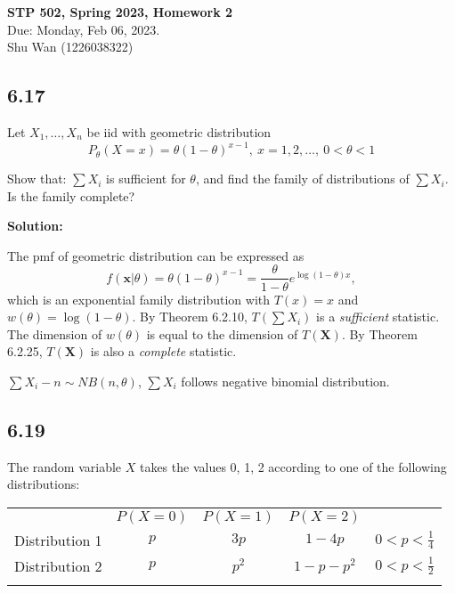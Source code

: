 \documentclass[11pt]{article}
\newcommand{\X}{\mathbf{X}}
\newcommand{\x}{\mathbf{x}}
\newcommand{\Sol}{\par {\bf Solution:}}
\newcommand{\sample}[1]{#1_1 , \dots , #1_n}
\begin{document}
\begin{center}
\Large{
\textbf{STP 502, Spring 2023, Homework 2} \\
Due: Monday, Feb 06, 2023. \\
Shu Wan (1226038322)
}
\end{center}

\subsection*{6.17}
Let $\sample{X}$ be iid with geometric distribution
$$P_\theta(X = x) = \theta(1-\theta)^{x-1}, ~ x = 1, 2, \dots, ~ 0 < \theta < 1$$

Show that: $\sum X_i$ is sufficient for $\theta$, and find the family of distributions of $\sum X_i$. Is the family complete?

\Sol

The pmf of geometric distribution can be expressed as
\[
f(\x | \theta) = \theta(1-\theta)^{x-1} = \frac{\theta}{1-\theta}e^{\log (1-\theta)x},
\]
which is an exponential family distribution with $T(x) = x$ and $w(\theta) = \log (1-\theta)$. By Theorem 6.2.10, $T(\sum X_i)$ is a \emph{sufficient} statistic. The dimension of $w(\theta)$ is equal to the dimension of $T(\X)$. By Theorem 6.2.25, $T(\X)$ is also a \emph{complete} statistic.

$\sum X_i - n \sim NB(n, \theta)$, $\sum X_i$ follows negative binomial distribution.

\subsection*{6.19}
The random variable $X$ takes the values 0, 1, 2 according to one of the following distributions:

\begin{table}[h]
\centering
\begin{tabular}{ccccc}
                     & $P(X = 0)$          & $P(X = 1)$          & $P(X = 2)$          &                      \\ \cline{2-4}
Distribution 1       & $p$                   & $3p$               & $1-4p$                & $0 < p < \frac14$                    \\
Distribution 2       & $p$                    & $p^2$ & $1-p-p^2$                    & $0 < p < \frac12$                  \\
\multicolumn{1}{l}{} & \multicolumn{1}{l}{} & \multicolumn{1}{l}{} & \multicolumn{1}{l}{} & \multicolumn{1}{l}{}
\end{tabular}
\end{table}
\end{document}
